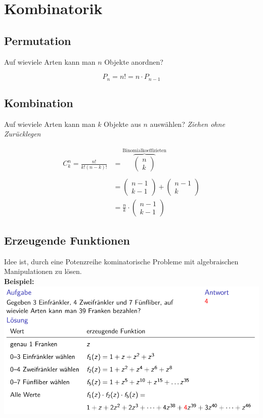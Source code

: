 \section{Kombinatorik}

\subsection{Permutation}
Auf wieviele Arten kann man $n$ Objekte anordnen?

\[
P_n = n! = n \cdot P_{n-1}
\]

\subsection{Kombination}
Auf wieviele Arten kann man $k$ Objekte aus $n$ auswählen? \textit{Ziehen ohne Zurücklegen}

\begin{align*}
	C_k^n = \frac{n!}{k!(n-k)!} &= \overbrace{\begin{pmatrix}	n \\ k \end{pmatrix}}^\text{Binomialkoeffizieten} \\ \\
	&=  \begin{pmatrix}	n - 1 \\ k -1\end{pmatrix} +  \begin{pmatrix}	n -1\\ k \end{pmatrix} \\
	&= \frac{n}{k} \cdot  \begin{pmatrix}	n - 1 \\ k -1\end{pmatrix}
\end{align*}


\subsection{Erzeugende Funktionen}
Idee ist, durch eine Potenzreihe kominatorische Probleme mit algebraischen Manipulationen zu lösen.\\
\textbf{Beispiel:}\\
\includegraphics[width=\columnwidth]{Images/erzeugendeFunktion}


